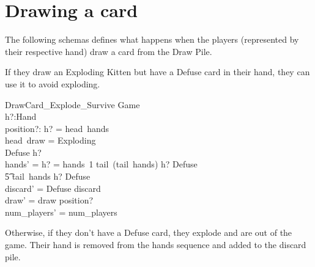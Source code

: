 \documentclass[11pt, fuzz]{article}
\begin{document}



\section{Drawing a card}

The following schemas defines what happens when the players (represented by their respective hand) draw a card from the Draw Pile. 

If they draw an Exploding Kitten but have a Defuse card in their hand, they can use it to avoid exploding. 

\begin{schema}{DrawCard\_Explode\_Survive}
    \Delta Game \\
    h?:Hand \\
    position?: \nat
\where
    h? = head~hands \\
    head~draw = Exploding \\
    Defuse \inbag h? \\
    hands' = \IF h? = hands~1 \THEN tail~(tail~hands) \cat \langle h? \uminus \lbag Defuse \rbag \rangle \\ \t5 \ELSE tail~hands \cat \langle h? \uminus \lbag Defuse \rbag \rangle\\
    discard' = \langle Defuse \rangle \cat discard \\
    draw' = draw \insertHead position? \\
    num\_players' = num\_players
\end{schema}


Otherwise, if they don't have a Defuse card, they explode and are out of the game. Their hand is removed from the hands sequence and added to the discard pile. 
\end{document}
